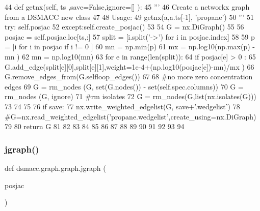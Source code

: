 \begin{DoxyCode}
44 \textcolor{keyword}{def }getnx(self, ts ,save=False,ignore=[] ):
45     \textcolor{stringliteral}{'''}
46 \textcolor{stringliteral}{    Create a networkx graph from a DSMACC new class}
47 \textcolor{stringliteral}{    }
48 \textcolor{stringliteral}{    Usage: }
49 \textcolor{stringliteral}{        getnx(a,a.ts[-1], 'propane')}
50 \textcolor{stringliteral}{    '''}
51     \textcolor{keywordflow}{try}: self.posjac
52     \textcolor{keywordflow}{except}:self.create\_posjac()
53     
54     G = nx.DiGraph()
55     
56     posjac = self.posjac.loc[ts,:]
57     split = [i.split(\textcolor{stringliteral}{'->'}) \textcolor{keywordflow}{for} i \textcolor{keywordflow}{in} posjac.index]
58     
59     p = [i \textcolor{keywordflow}{for} i \textcolor{keywordflow}{in} posjac \textcolor{keywordflow}{if} i != 0 ]
60     mn = np.min(p)
61     mx = np.log10(np.max(p) - mn )
62     mn = np.log10(mn)
63     \textcolor{keywordflow}{for} e \textcolor{keywordflow}{in} range(len(split)):
64         \textcolor{keywordflow}{if} posjac[e] > 0 :
65             G.add\_edge(split[e][0],split[e][1],weight=1e-4+(np.log10(posjac[e])-mn)/mx )
66     G.remove\_edges\_from(G.selfloop\_edges())
67     
68     \textcolor{comment}{#no more zero concentration edges}
69     G = rm\_nodes (G, set(G.nodes()) - set(self.spec.columns))
70     G = rm\_nodes (G, ignore)
71     \textcolor{comment}{#rm isolates}
72     G = rm\_nodes(G,list(nx.isolates(G)))
73 
74     
75     
76     \textcolor{keywordflow}{if} save:
77         nx.write\_weighted\_edgelist(G, save+\textcolor{stringliteral}{'.wedgelist'})
78     \textcolor{comment}{#G=nx.read\_weighted\_edgelist('propane.wedgelist',create\_using=nx.DiGraph)}
79 
80     \textcolor{keywordflow}{return} G 
81 
82     
83     
84     
85 
86 
87 
88 
89 
90 
91 
92 
93 
94 
\end{DoxyCode}
\mbox{\label{namespacedsmacc_1_1graph_1_1graph_a63af59bfa3dc885cc6d4f1ac1e79ac0f}} 
\subsubsection{\texorpdfstring{jgraph()}{jgraph()}}
{\footnotesize\ttfamily def dsmacc.\+graph.\+graph.\+jgraph (\begin{DoxyParamCaption}\item[{}]{posjac }\end{DoxyParamCaption})}

